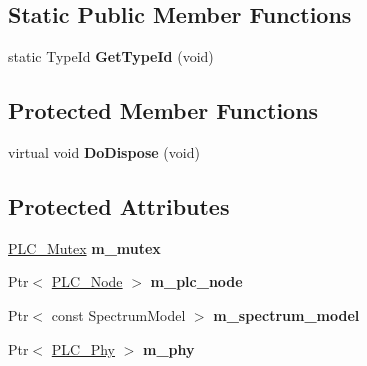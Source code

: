 \subsection*{\-Static \-Public \-Member \-Functions}
\begin{DoxyCompactItemize}
\item 
\hypertarget{classns3_1_1PLC__Interface_a1cdef444d546a3967ea0aee8c4d605a1}{static \-Type\-Id {\bfseries \-Get\-Type\-Id} (void)}\label{classns3_1_1PLC__Interface_a1cdef444d546a3967ea0aee8c4d605a1}

\end{DoxyCompactItemize}
\subsection*{\-Protected \-Member \-Functions}
\begin{DoxyCompactItemize}
\item 
\hypertarget{classns3_1_1PLC__Interface_a3f004e2e2c1ebce93fa38fe0c7a9d858}{virtual void {\bfseries \-Do\-Dispose} (void)}\label{classns3_1_1PLC__Interface_a3f004e2e2c1ebce93fa38fe0c7a9d858}

\end{DoxyCompactItemize}
\subsection*{\-Protected \-Attributes}
\begin{DoxyCompactItemize}
\item 
\hypertarget{classns3_1_1PLC__Interface_a601610231531a725be13634851a853e6}{\hyperlink{structns3_1_1PLC__Mutex}{\-P\-L\-C\-\_\-\-Mutex} {\bfseries m\-\_\-mutex}}\label{classns3_1_1PLC__Interface_a601610231531a725be13634851a853e6}

\item 
\hypertarget{classns3_1_1PLC__Interface_a1bd242a8f74f65ad8c856bc331a63f20}{\-Ptr$<$ \hyperlink{classns3_1_1PLC__Node}{\-P\-L\-C\-\_\-\-Node} $>$ {\bfseries m\-\_\-plc\-\_\-node}}\label{classns3_1_1PLC__Interface_a1bd242a8f74f65ad8c856bc331a63f20}

\item 
\hypertarget{classns3_1_1PLC__Interface_a3f86b2927a461f43fca67f291f59b37a}{\-Ptr$<$ const \-Spectrum\-Model $>$ {\bfseries m\-\_\-spectrum\-\_\-model}}\label{classns3_1_1PLC__Interface_a3f86b2927a461f43fca67f291f59b37a}

\item 
\hypertarget{classns3_1_1PLC__Interface_ab6a5dc7b7244416f562f1b63eb0079c2}{\-Ptr$<$ \hyperlink{classns3_1_1PLC__Phy}{\-P\-L\-C\-\_\-\-Phy} $>$ {\bfseries m\-\_\-phy}}\label{classns3_1_1PLC__Interface_ab6a5dc7b7244416f562f1b63eb0079c2}

\end{DoxyCompactItemize}


